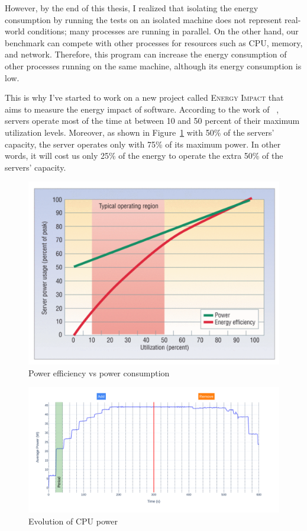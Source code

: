 However, by the end of this thesis, I realized that isolating the energy consumption by running the tests on an isolated machine does not represent real-world conditions; many processes are running in parallel. On the other hand, our benchmark can compete with other processes for resources such as CPU, memory, and network. Therefore, this program can increase the energy consumption of other processes running on the same machine, although its energy consumption is low.

This is why I've started to work on a new project called \textsc{Energy Impact} that aims to measure the energy impact of software.
According to the work of \citeauthor{barroso2007case}~\cite{barroso2007case}, servers operate most of the time at between 10 and 50 percent of their maximum utilization levels. Moreover, as shown in Figure~\ref{fig:soa_energy_efficiency} with 50\% of the servers' capacity, the server operates only with  75\% of its maximum power. In other words, it will cost us only 25\% of the energy to operate the extra 50\% of the servers' capacity.

\begin{figure}[!h]
      \centering
      \includegraphics[width=0.9\linewidth,keepaspectratio]{chapters/soa_energy_efficiency}
      \caption{Power efficiency vs power consumption\cite{barroso2007case}}
      \label{fig:soa_energy_efficiency}
\end{figure}

\begin{figure}[!h]
      \centering
      \caption{Evolution of CPU power}
      \label{fig:power_evolution_greenfaas}
      \includegraphics[width=\linewidth]{chapters/power_evolution_greenfaas}
\end{figure}

